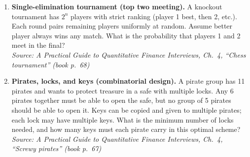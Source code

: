 \documentclass[11pt]{article}
\begin{document}
\begin{enumerate}[label=\textbf{\arabic*.}, resume]
\item \textbf{Single-elimination tournament (top two meeting).}
A knockout tournament has $2^n$ players with strict ranking (player 1 best, then 2, etc.).
Each round pairs remaining players uniformly at random. Assume better player always wins any match.
What is the probability that players 1 and 2 meet in the final?\\
\hfill{\small\textit{Source: A Practical Guide to Quantitative Finance Interviews, Ch.\ 4, ``Chess tournament'' (book p.\ 68)}}

\item \textbf{Pirates, locks, and keys (combinatorial design).}
A pirate group has 11 pirates and wants to protect treasure in a safe with multiple locks.
Any 6 pirates together must be able to open the safe, but no group of 5 pirates should be able to open it.
Keys can be copied and given to multiple pirates; each lock may have multiple keys.
What is the minimum number of locks needed, and how many keys must each pirate carry in this optimal scheme?\\
\hfill{\small\textit{Source: A Practical Guide to Quantitative Finance Interviews, Ch.\ 4, ``Screwy pirates'' (book p.\ 67)}}

\end{enumerate}
\end{document}
